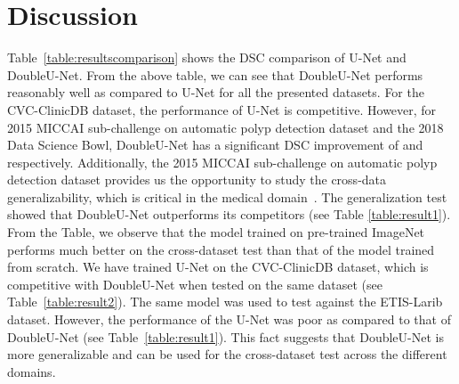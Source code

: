 \documentclass[conference]{IEEEtran}
\begin{document}
\begin{table} [t]
 \caption{Relative improvement of DoubleU-Net on U-Net}
    \label{table:resultscomparison}
  \def\arraystretch{1.1}
    \setlength\tabcolsep{5pt}
    \par\bigskip
    \centering
\end{table}	



\section{Discussion}
\label{sec:discussion}
Table~\ref{table:resultscomparison} shows the DSC comparison of U-Net and DoubleU-Net. From the above table, we can see that DoubleU-Net performs reasonably well as compared to U-Net for all the presented datasets. For the CVC-ClinicDB dataset, the performance of U-Net is competitive. However, for 2015 MICCAI sub-challenge on automatic polyp detection dataset and the 2018 Data Science Bowl, DoubleU-Net has a significant DSC improvement of  and  respectively. Additionally, the 2015 MICCAI sub-challenge on automatic polyp detection dataset provides us the opportunity to study the cross-data generalizability,  which is critical in the medical domain~\cite{thambawita2020extensive}.   The generalization test showed that DoubleU-Net outperforms its competitors (see Table \ref{table:result1}). From the Table, we observe that the model trained on pre-trained ImageNet~\cite{deng2009imagenet} performs much better on the cross-dataset test than that of the model trained from scratch. We have trained U-Net on the CVC-ClinicDB dataset, which is competitive with DoubleU-Net when tested on the same dataset (see Table~\ref{table:result2}). The same model was used to test against the ETIS-Larib dataset. However, the performance of the U-Net was poor as compared to that of DoubleU-Net (see Table~\ref{table:result1}).  This fact suggests that DoubleU-Net is more generalizable and can be used for the cross-dataset test across the different domains. 
\end{document}
